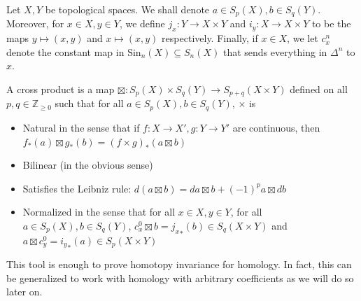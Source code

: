 \documentclass[12pt,reqno]{amsart}
\numberwithin{theorem}{section}
\theoremstyle{definition}
\theoremstyle{remark}
\numberwithin{equation}{section}
\newcommand{\Z}{\mathbb Z}
\theoremstyle{definition}
\newcommand{\Sin}{\mathrm{Sin}}
\begin{document}
Let $X,Y$ be topological spaces. We shall denote $a \in S_p(X),b \in S_q(Y)$. Moreover, for $x \in X, y \in Y$, we define $j_x:Y \rightarrow X\times Y$ and $i_y : X\rightarrow X \times Y$ to be the maps $y \mapsto (x,y)$ and $x \mapsto (x,y)$ respectively. Finally, if $x \in X$, we let $c_x^n$ denote the constant map in $\Sin_n(X)\subseteq S_n(X)$ that sends everything in $\Delta^n$ to $x$. 
\begin{definition}
A cross product is a map $\boxtimes : S_p(X) \times S_q(Y) \rightarrow S_{p+q}(X\times Y)$ defined on all $p,q \in \Z_{\geq 0}$ such that for all $a \in S_p(X),b \in S_q(Y)$, $\times$ is 
\begin{itemize}
    \item Natural in the sense that if $f:X\rightarrow X', g:Y\rightarrow Y' $ are continuous, then $f_*(a)\boxtimes g_*(b) = (f\times g)_*(a\boxtimes b)$
    \item Bilinear (in the obvious sense)
    \item Satisfies the Leibniz rule: $d(a\boxtimes b)= da\boxtimes b +(-1)^pa\boxtimes db$
    \item Normalized in the sense that for all $x \in X, y \in Y$, for all $a \in S_p(X),b \in S_q(Y)$, $c_x^0 \boxtimes b = {j_x}_*(b) \in S_q(X\times Y)$ and $a \boxtimes c_y^0 = {i_y}_*(a) \in S_p(X\times Y)$ 
\end{itemize}
\end{definition}
This tool is enough to prove homotopy invariance for homology. In fact, this can be generalized to work with homology with arbitrary coefficients as we will do so later on. 
\end{document}
